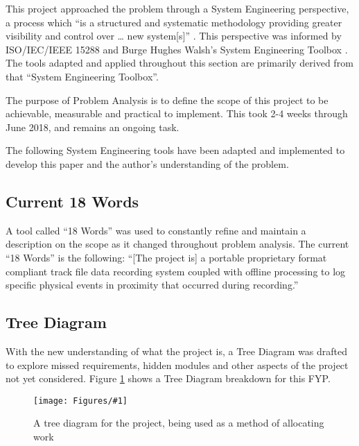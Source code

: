 \documentclass{UoNMCHA}
\newcommand{\inlineQuote}[1]{``#1''}
\newcommand{\fref}[1] {Figure \ref{#1}}
\newcommand{\fFigure}[3]{
	\begin{figure}[h]
        \begin{center}  
            \texttt{[image: Figures/\#1]}  
            \caption{#2}
            \label{#1}
        \end{center}
	\end{figure}
}
\numberwithin{equation}{section}
\begin{document}
This project approached the problem through a System Engineering perspective, a process which “is a structured and systematic methodology providing greater visibility and control over … new system[s]” \cite{limited2018systems}. This perspective was informed by ISO/IEC/IEEE 15288 \cite{IEEE15288} and Burge Hughes Walsh’s System Engineering Toolbox \cite{SysThink2015}. The tools adapted and applied throughout this section are primarily derived from that \inlineQuote{System Engineering Toolbox}. 

The purpose of Problem Analysis is to define the scope of this project to be achievable, measurable and practical to implement. This took 2-4 weeks through June 2018, and remains an ongoing task. 

The following System Engineering tools have been adapted and implemented to develop this paper and the author’s understanding of the problem. 

\subsection{Current 18 Words}
A tool called \inlineQuote{18 Words} was used to constantly refine and maintain a description on the scope as it changed throughout problem analysis. The current “18 Words” is the following:
“[The project is] a portable proprietary format compliant track file data recording system coupled with offline processing to log specific physical events in proximity that occurred during recording.” 

\subsection{Tree Diagram}
With the new understanding of what the project is, a Tree Diagram was drafted to explore missed requirements, hidden modules and other aspects of the project not yet considered. \fref{treeDiagram.png} shows a Tree Diagram breakdown for this FYP.

 \fFigure{treeDiagram.png}{A tree diagram for the project, being used as a method of allocating work}{0.7}
\end{document}
